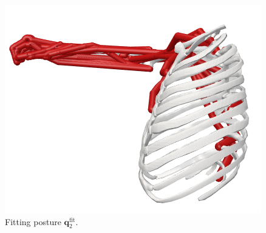 \begin{figure}[!htb]
\begin{minipage}{0.3\linewidth}
        \includegraphics[trim={0 0 0 0}, clip, width=0.72\linewidth]{img/chapter_4/pose_4_side.png}
    \end{minipage}
    \caption{Fitting posture $\mathbf{q}_2^{\text{fit}}$.}
    \label{fig:pose_2}
\end{figure}

